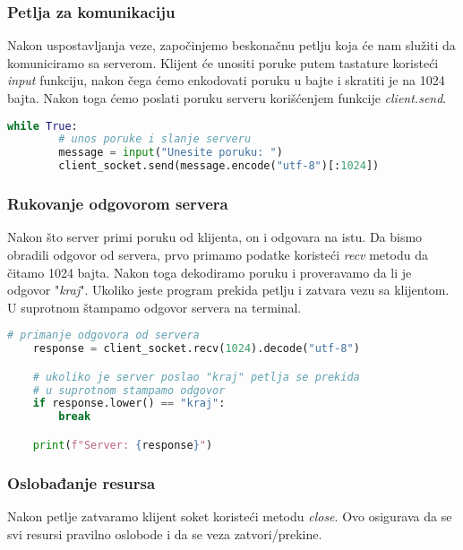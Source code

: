 \subsubsection{Petlja za komunikaciju}

Nakon uspostavljanja veze, započinjemo beskonačnu petlju koja će nam služiti da komuniciramo sa serverom. Klijent će unositi poruke putem tastature koristeći \emph{input} funkciju, nakon čega ćemo enkodovati poruku u bajte i skratiti je na 1024 bajta. Nakon toga ćemo poslati poruku serveru korišćenjem funkcije \emph{client.send}.

\vspace{0.5cm}

\begin{lstlisting}[language = Python]
    while True:
        # unos poruke i slanje serveru
        message = input("Unesite poruku: ")
        client_socket.send(message.encode("utf-8")[:1024])
\end{lstlisting}

\subsubsection{Rukovanje odgovorom servera}

Nakon što server primi poruku od klijenta, on i odgovara na istu. Da bismo obradili odgovor od servera, prvo primamo podatke koristeći \emph{recv} metodu da čitamo 1024 bajta. Nakon toga dekodiramo poruku i proveravamo da li je odgovor "\emph{kraj}". Ukoliko jeste program prekida petlju i zatvara vezu sa klijentom. U suprotnom štampamo odgovor servera na terminal.

\vspace{0.5cm}

\begin{lstlisting}[language = Python]
    # primanje odgovora od servera
    response = client_socket.recv(1024).decode("utf-8")

    # ukoliko je server poslao "kraj" petlja se prekida
    # u suprotnom stampamo odgovor
    if response.lower() == "kraj":
        break

    print(f"Server: {response}")
\end{lstlisting}

\subsubsection{Oslobađanje resursa}

Nakon petlje zatvaramo klijent soket koristeći metodu \emph{close}. Ovo osigurava da se svi resursi pravilno oslobode i da se veza zatvori/prekine.

